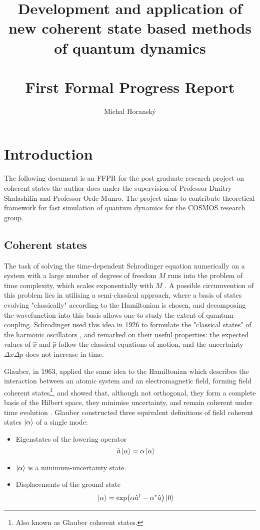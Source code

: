\documentclass[12pt]{article}
\begin{document}
	\title{Development and application of new coherent state based methods of quantum dynamics\\\hfill\\First Formal Progress Report}
	\author{Michal Horanský}
	\maketitle
	
	\tableofcontents
	
	\section{Introduction}
	The following document is an FFPR for the post-graduate research project on coherent states the author does under the supervision of Professor Dmitry Shalashilin and Professor Orde Munro. The project aims to contribute theoretical framework for fast simulation of quantum dynamics for the COSMOS research group.
	\subsection{Coherent states}
	The task of solving the time-dependent Schrodinger equation numerically on a system with a large number of degrees of freedom $M$ runs into the problem of time complexity, which scales exponentially with $M$ \cite[Sec. 1.2]{curse_of_dimensionality}. A possible circumvention of this problem lies in utilising a semi-classical approach, where a basis of states evolving "classically" according to the Hamiltonian is chosen, and decomposing the wavefunction into this basis allows one to study the extent of quantum coupling. Schrodinger used this idea in 1926 to formulate the "classical states" of the harmonic oscillators \cite{harmonic_classical_states}, and remarked on their useful properties: the expected values of $\hat{x}$ and $\hat{p}$ follow 	the classical equations of motion, and the uncertainty $\Delta x\Delta p$ does not increase in time.
	
	Glauber, in 1963, applied the same idea to the Hamiltonian which describes the interaction between an atomic system and an electromagnetic field, forming field coherent states\footnote{Also known as Glauber coherent states.}, and showed that, although not orthogonal, they form a complete basis of the Hilbert space, they minimise uncertainty, and remain coherent under time evolution \cite{field_coherent_states}. Glauber constructed three equivalent definitions of field coherent states $\ket{\alpha}$ of a single mode:
	\begin{itemize}
		\item Eigenstates of the lowering operator
		$$\hat{a}\ket{\alpha} = \alpha\ket{\alpha}$$
		\item $\ket{\alpha}$ is a minimum-uncertainty state.
		\item Displacements of the ground state
		$$\ket{\alpha} = \exp(\alpha\hat{a}^\dagger-\alpha^*\hat{a})\ket{0}$$
	\end{itemize}
	
\end{document}
